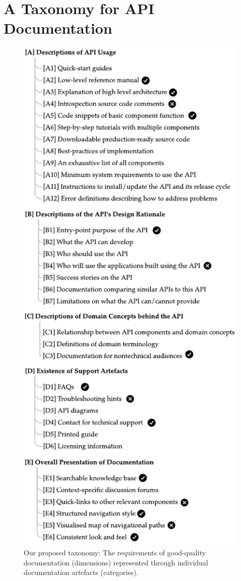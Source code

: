 \section{A Taxonomy for API Documentation}
\label{tse2020:sec:findings}

\begin{figure}[p]
\centering
\includegraphics[width=.7\linewidth]{taxonomy.pdf}
\caption[Our proposed API documentation taxonomy]{Our proposed taxonomy: The requirements of good-quality  documentation (dimensions) represented through individual documentation artefacts (categories).}
\label{tse2020:fig:taxonomy}
\end{figure}

